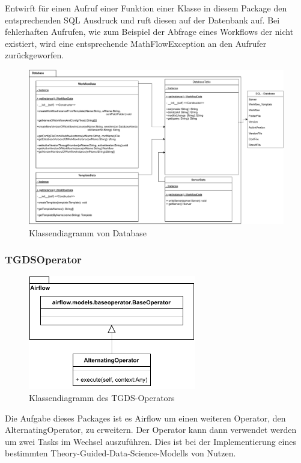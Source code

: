 \subsubsection{}
Entwirft für einen Aufruf einer Funktion einer Klasse in diesem Package den entsprechenden SQL Ausdruck und ruft diesen auf der Datenbank auf.
Bei fehlerhaften Aufrufen, wie zum Beispiel der Abfrage eines Workflows der nicht existiert, wird eine entsprechende MathFlowException an den Aufrufer zurückgeworfen.
\begin{figure}[H]
	\centering
	\includegraphics[width=1\textwidth]{res/Database_Package.pdf} 
	\caption{Klassendiagramm von Database}
	\label{fig:database_package}
\end{figure}


\subsubsection{TGDSOperator}
\begin{figure}[H]
    \centering
    \includegraphics[width=0.65\textwidth]{res/Klassen/tgdsOp.pdf}
    \caption{Klassendiagramm des TGDS-Operators}
\end{figure}
Die Aufgabe dieses Packages ist es Airflow um einen weiteren Operator, den AlternatingOperator, zu erweitern.
Der Operator kann dann verwendet werden um zwei Tasks im Wechsel auszuführen. 
Dies ist bei der Implementierung eines bestimmten Theory-Guided-Data-Science-Modells von Nutzen. 


